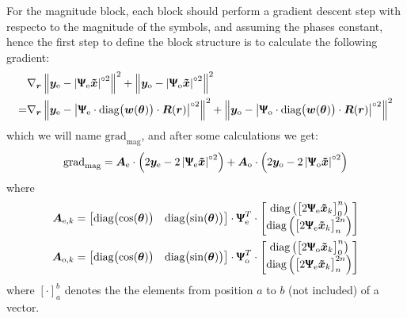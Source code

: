 For the magnitude block, each block should perform a gradient descent step with respecto to the magnitude of the symbols, and assuming the phases constant, hence the first step to define the block structure is to calculate the following gradient:
 \begin{align}
	&\nabla_{\bm r}\left\lVert \bm y_\text{e} - \left|\bm{\Uppsi_\text{e}\tilde{x} } \right|^{\circ2}\right\rVert^2+\left\lVert \bm y_\text{o} - \left|\bm{\Uppsi_\text{o}\tilde{x} } \right|^{\circ2}\right\rVert^2\\
	=&\nabla_{\bm r}\left\lVert \bm y_\text{e} - \left|\bm{\Uppsi}_\text{e}\cdot\text{diag}\bigl(\bm w(\bm\theta)\bigr)\cdot\bm R(\bm r)  \right|^{\circ2}\right\rVert^2+\left\lVert \bm y_\text{o} - \left|\bm{\Uppsi}_\text{o}\cdot\text{diag}\bigl(\bm w(\bm\theta)\bigr)\cdot\bm R(\bm r)  \right|^{\circ2}\right\rVert^2
\end{align}
which we will name $\text{grad}_\text{mag}$, and after some calculations we get:
\begin{equation}
\text{grad}_\text{mag}=\bm A_\text{e}\cdot\left(2\bm y_\text{e} - 2\left|\bm{\Uppsi}_\text{e}\bm{\tilde{x}}\right|^{\circ2}\right)+
\bm A_\text{o}\cdot\left(2\bm y_\text{o} - 2\left|\bm{\Uppsi}_\text{o}\bm{\tilde{x}}\right|^{\circ2}\right)
\label{eq:grad_mag}
\end{equation}
where
\begin{align}
\bm A_{\text{e},k}&=\begin{bmatrix}\text{diag}\bigl(\cos(\bm\theta)\bigr)&\text{diag}\bigl(\sin(\bm\theta)\bigr)\end{bmatrix}\cdot\bm\Uppsi_\text{e}^T\cdot\begin{bmatrix}\text{diag}\left(\bigl[2\bm{\Uppsi}_\text{e}\bm{\tilde{x}}_k\bigr]_0^n\right)\\\text{diag}\left(\bigl[2\bm{\Uppsi}_\text{e}\bm{\tilde{x}}_k \bigr]_{n}^{2n}\right)\end{bmatrix}\\
\bm A_{\text{o},k}&=\begin{bmatrix}\text{diag}\bigl(\cos(\bm\theta)\bigr)&\text{diag}\bigl(\sin(\bm\theta)\bigr)\end{bmatrix}\cdot\bm\Uppsi_\text{o}^T\cdot\begin{bmatrix}\text{diag}\left(\bigl[2\bm{\Uppsi}_\text{o}\bm{\tilde{x}}_k\bigr]_0^n\right)\\\text{diag}\left(\bigl[2\bm{\Uppsi}_\text{e}\bm{\tilde{x}}_k\bigr]_{n}^{2n}\right)\end{bmatrix}
\end{align}
where $[\cdot]_a^b$ denotes the the elements from position $a$ to $b$ (not included) of a vector.\\

